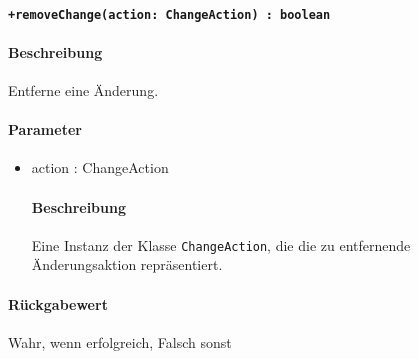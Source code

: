 \paragraph{\texttt{+removeChange(action: ChangeAction) : boolean}}%
\paragraph*{Beschreibung}
Entferne eine Änderung.
\paragraph*{Parameter}
\begin{itemize}
    \item action : ChangeAction
            \paragraph*{Beschreibung}
            Eine Instanz der Klasse \verb#ChangeAction#, die die zu entfernende Änderungsaktion repräsentiert.
\end{itemize}
\paragraph*{Rückgabewert}
Wahr, wenn erfolgreich, Falsch sonst